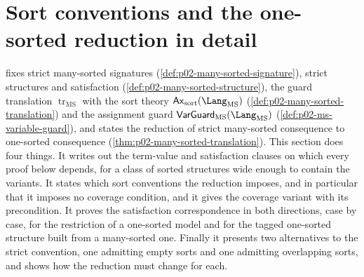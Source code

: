 \section{Sort conventions and the one-sorted reduction in detail}
\label{sec:p02-w02-p02-038-many-sorted-reduction}

 fixes strict many-sorted signatures
(\cref{def:p02-many-sorted-signature}), strict structures and satisfaction
(\cref{def:p02-many-sorted-structure}), the guard translation
\(\operatorname{tr}_{\mathrm{MS}}\) with the sort theory
\(\mathsf{Ax}_{\mathrm{sort}}(\Lang_{\mathrm{MS}})\)
(\cref{def:p02-many-sorted-translation}) and the assignment guard
\(\mathsf{VarGuard}_{\mathrm{MS}}(\Lang_{\mathrm{MS}})\)
(\cref{def:p02-ms-variable-guard}), and states the reduction of strict
many-sorted consequence to one-sorted consequence
(\cref{thm:p02-many-sorted-translation}).  This section does four things.
It writes out the term-value and satisfaction clauses on which every proof
below depends, for a class of sorted structures wide enough to contain the
variants.  It states which sort conventions the reduction imposes, and in
particular that it imposes no coverage condition, and it gives the coverage
variant with its precondition.  It proves the satisfaction correspondence in
both directions, case by case, for the restriction of a one-sorted model and
for the tagged one-sorted structure built from a many-sorted one.  Finally it
presents two alternatives to the strict convention, one admitting empty sorts
and one admitting overlapping sorts, and shows how the reduction must change
for each.

